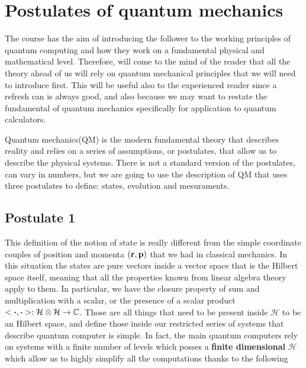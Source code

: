 \section{Postulates of quantum mechanics}

The course has the aim of introducing the follower to the working principles of quantum computing and how they work on a fundamental physical and mathematical level. Therefore, will come to the mind of the reader that all the theory ahead of us will rely on quantum mechanical principles that we will need to introduce first. This will be useful also to the experienced reader since a refresh can is always good, and also because we may want to restate the fundamental of quantum mechanics specifically for application to quantum calculators.

Quantum mechanics(QM) is the modern fundamental theory that describes reality and relies on a series of assumptions, or postulates, that allow us to describe the physical systems. There is not a standard version of the postulates, can vary in numbers, but we are going to use the description of QM that uses three postulates to define: states, evolution and mesuraments.

\subsection{Postulate 1}


\noindent
This definition of the notion of state is really different from the simple coordinate couples of position and momenta $(\vb{r}, \vb{p})$ that we had in classical mechanics. In this situation the states are pure vectors inside a vector space that is the Hilbert space itself, meaning that all the properties known from linear algebra theory apply to them. In particular, we have the closure property of sum and multiplication with a scalar, or the presence of a scalar product $<\vdot,\vdot> : \mathcal{H}\otimes\mathcal{H} \to \mathbb{C}$. Those are all things that need to be present inside $\mathcal{H}$ to be an Hilbert space, and define those inside our restricted series of systems that describe quantum computer is simple. In fact, the main quantum computers rely on systems with a finite number of levels which posses a \textbf{finite dimensional} $\mathcal{H}$ which allow us to highly simplify all the computations thanks to the following 

